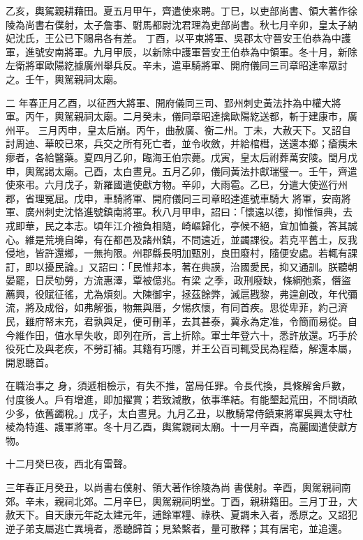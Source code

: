 \begin{pinyinscope}
 乙亥，輿駕親耕藉田。夏五月甲午，齊遣使來聘。丁巳，以吏部尚書、領大著作徐陵為尚書右僕射，太子詹事、駙馬都尉沈君理為吏部尚書。秋七月辛卯，皇太子納妃沈氏，王公已下賜帛各有差。
 丁酉，以平東將軍、吳郡太守晉安王伯恭為中護軍，進號安南將軍。九月甲辰，以新除中護軍晉安王伯恭為中領軍。冬十月，新除左衛將軍歐陽紇據廣州舉兵反。辛未，遣車騎將軍、開府儀同三司章昭達率眾討
 之。壬午，輿駕親祠太廟。



 二
 年春正月乙酉，以征西大將軍、開府儀同三司、郢州刺史黃法抃為中權大將軍。丙午，輿駕親祠太廟。二月癸未，儀同章昭達擒歐陽紇送都，斬于建康市，廣州平。
 三月丙申，皇太后崩。丙午，曲赦廣、衡二州。丁未，大赦天下。又詔自討周迪、華皎已來，兵交之所有死亡者，並令收斂，并給棺槥，送還本鄉；瘡痍未瘳者，各給醫藥。夏四月乙卯，臨海王伯宗薨。戊寅，皇太后祔葬萬安陵。閏月戊申，輿駕謁太廟。己酉，太白晝見。五月乙卯，儀同黃法抃獻瑞璧一。壬午，齊遣使來弔。六月戊子，新羅國遣使獻方物。辛卯，大雨雹。乙巳，分遣大使巡行州郡，省理冤屈。戊申，車騎將軍、開府儀同三司章昭達進號車騎大
 將軍，安南將軍、廣州刺史沈恪進號鎮南將軍。秋八月甲申，詔曰：「懷遠以德，抑惟恒典，去戎即華，民之本志。頃年江介襁負相隨，崎嶇歸化，亭候不絕，宜加恤養，答其誠心。維是荒境自皞，有在都邑及諸州鎮，不問遠近，並蠲課役。若克平舊土，反我侵地，皆許還鄉，一無拘限。州郡縣長明加甄別，良田廢村，隨便安處。若輒有課訂，即以擾民論。」又詔曰：「民惟邦本，著在典謨，治國愛民，抑又通訓。朕聽朝晏罷，日昃劬勞，方流惠澤，覃被億兆。有梁
 之季，政刑廢缺，條綱弛紊，僭盜薦興，役賦征徭，尤為煩刻。大陳御宇，拯茲餘弊，滅扈戡黎，弗遑創改，年代彌流，將及成俗，如弗解張，物無與厝，夕惕疚懷，有同首疾。思從卑菲，約己濟民，雖府帑末充，君孰與足，便可刪革，去其甚泰，冀永為定准，令簡而易從。自今維作田，值水旱失收，即列在所，言上折除。軍士年登六十，悉許放還。巧手於役死亡及與老疾，不勞訂補。其籍有巧隱，并王公百司輒受民為程蔭，解還本屬，開恩聽首。



 在職治事之
 身，須遞相檢示，有失不推，當局任罪。令長代換，具條解舍戶數，付度後人。戶有增進，即加擢賞；若致減散，依事準結。有能墾起荒田，不問頃畝少多，依舊蠲稅。」戊子，太白晝見。九月乙丑，以散騎常侍鎮東將軍吳興太守杜棱為特進、護軍將軍。冬十月乙酉，輿駕親祠太廟。十一月辛酉，高麗國遣使獻方物。



 十二月癸巳夜，西北有雷聲。



 三年春正月癸丑，以尚書右僕射、領大著作徐陵為尚
 書僕射。辛酉，輿駕親祠南郊。辛未，親祠北郊。二月辛巳，輿駕親祠明堂。丁酉，親耕籍田。三月丁丑，大赦天下。自天康元年訖太建元年，逋餘軍糧、祿秩、夏調未入者，悉原之。又詔犯逆子弟支屬逃亡異境者，悉聽歸首；見縶繫者，量可散釋；其有居宅，並追還。




\end{pinyinscope}
